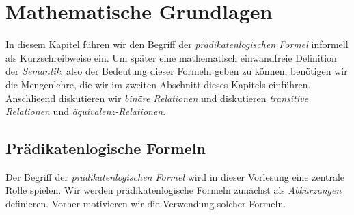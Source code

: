\chapter{Mathematische Grundlagen} 
In diesem Kapitel f\"{u}hren wir den Begriff der \emph{pr\"{a}dikatenlogischen Formel} informell
als Kurzschreibweise ein.  Um sp\"{a}ter eine mathematisch einwandfreie Definition der
\emph{Semantik}, also der Bedeutung dieser Formeln geben zu k\"{o}nnen, ben\"{o}tigen wir die
Mengenlehre, die wir im zweiten Abschnitt dieses Kapitels einf\"{u}hren.  Anschlie\3end
diskutieren wir \emph{bin\"{a}re Relationen} und diskutieren 
\emph{transitive Relationen} und \emph{\"{a}quivalenz-Relationen}.


\section{Pr\"{a}dikatenlogische Formeln}
Der Begriff der \emph{pr\"{a}dikatenlogischen Formel} wird in dieser Vorlesung eine zentrale
Rolle spielen.  Wir werden pr\"{a}dikatenlogische Formeln zun\"{a}chst als \emph{Abk\"{u}rzungen} definieren.  
Vorher motivieren wir die Verwendung solcher Formeln.

